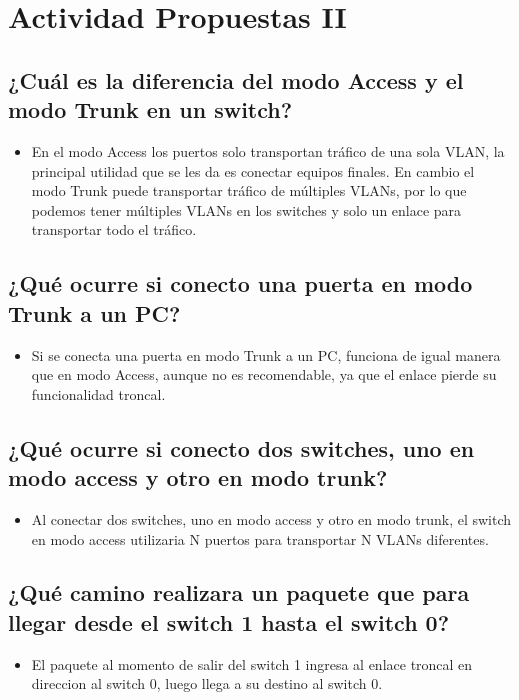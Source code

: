 \documentclass[spanish]{udpreport}
\begin{document}
\begin{itemize}

\end{itemize}

\section{Actividad Propuestas II}
\subsection{¿Cuál es la diferencia del modo Access y el modo Trunk en un switch? }
\begin{itemize}
\item 
En el modo Access los puertos solo  transportan tráfico de una sola VLAN, la principal utilidad que se les da es conectar equipos finales. En cambio el modo Trunk puede transportar tráfico de múltiples VLANs, por lo que podemos tener múltiples VLANs en los switches y solo un enlace para transportar todo el tráfico.
\end{itemize}
\subsection{¿Qué ocurre si conecto una puerta en modo Trunk a un PC?}
\begin{itemize}
\item
Si se conecta una puerta en modo Trunk a un PC, funciona de igual manera que en modo Access, aunque no es recomendable, ya que el enlace pierde su funcionalidad troncal.
\end{itemize}
\subsection{¿Qué ocurre si conecto dos switches, uno en modo access y otro en modo trunk?}
\begin{itemize}
\item
Al conectar dos switches, uno en modo access y otro en modo trunk, el switch en modo access utilizaria N puertos para transportar N VLANs diferentes.
\end{itemize}
\subsection{¿Qué camino realizara un paquete que para llegar desde el switch 1 hasta el
switch 0?}
\begin{itemize}
\item
El paquete al momento de salir del switch 1 ingresa al enlace troncal en direccion al switch 0, luego llega a su destino al switch 0.
\end{itemize}
\end{document}
